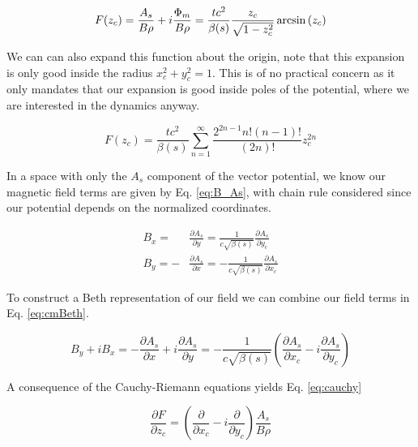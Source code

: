 \begin{equation} \label{eq:genF}
	F(z_c) = \frac{A_s}{B\rho} + i\frac{\Phi_m}{B\rho} = \frac{t c^2}{\beta(s)}\frac{z_c}{\sqrt{1-z_c^2}} \arcsin{(z_c)} \\ 
\end{equation}

We can can also expand this function about the origin, note that this expansion is only good inside the radius $x_c^2 + y_c^2 = 1$. This is of no practical concern as it only mandates that our expansion is good inside poles of the potential, where we are interested in the dynamics anyway.

\begin{equation} \label{eq:powF}
	F(z_c) = \frac{t c^2}{\beta(s)} \sum_{n=1}^{\infty} \frac{2^{2n-1}n!(n-1)!}{(2n)!} z_c^{2n}
\end{equation}

In a space with only the $A_s$ component of the vector potential, we know our magnetic field terms are given by Eq. \ref{eq:B_As}, with chain rule considered since our potential depends on the normalized coordinates.

\begin{equation} \label{eq:B_As}
\begin{split}
	B_x = &\frac{\partial A_s}{\partial y} = \frac{1}{c\sqrt{\beta(s)}}\frac{\partial A_s}{\partial y_c}\\
	B_y = -&\frac{\partial A_s}{\partial x} = -\frac{1}{c\sqrt{\beta(s)}}\frac{\partial A_s}{\partial x_c}
\end{split}
\end{equation}

To construct a Beth representation of our field we can combine our field terms in Eq. \ref{eq:cmBeth}.

\begin{equation} \label{eq:cmBeth}
	B_y + i B_x  = -\frac{\partial A_s}{\partial x} + i\frac{\partial A_s}{\partial y} = -\frac{1}{c\sqrt{\beta(s)}}\left(\frac{\partial A_s}{\partial x_c} - i\frac{\partial A_s}{\partial y_c}\right)
\end{equation}

A consequence of the Cauchy-Riemann equations yields Eq. \ref{eq:cauchy}

\begin{equation} \label{eq:cauchy}
	\frac{\partial F}{\partial z_c} = \left(\frac{\partial }{\partial x_c} - i\frac{\partial }{\partial y_c}\right) \frac{A_s}{B\rho}
\end{equation}

